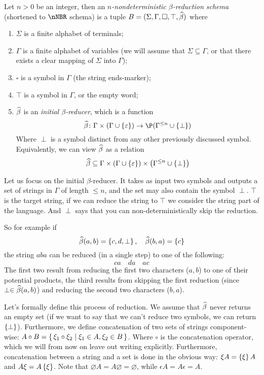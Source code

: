 \documentclass{llncs}
\begin{document}
\begin{definition}

    Let $n>0$ be an integer, then an \emph{$n$-nondeterministic $\beta$-reduction schema} (shortened to $\nNBR$ schema) is
    a tuple $B=(\Sigma,\Gamma,\square,\top,\widehat\beta)$ where
    \begin{enumerate}
        \item $\Sigma$ is a finite alphabet of terminals;
        \item $\Gamma$ is a finite alphabet of variables (we will assume that $\Sigma\subseteq\Gamma$, or that there exists a
            clear mapping of $\Sigma$ into $\Gamma$);
        \item $\square$ is a symbol in $\Gamma$ (the string ends-marker);
        \item $\top$ is a symbol in $\Gamma$, or the empty word;
        \item $\widehat\beta$ is an \emph{initial $\beta$-reducer}, which is a function
        $$ \hb\colon\Gamma\times(\Gamma\cup\set\epsilon)\to\P(\Gamma^{\leq n}\cup\set\perp) $$
        Where $\perp$ is a symbol distinct from any other previously discussed symbol.
        Equivalently, we can view $\widehat\beta$ as a relation
        $$ \hb \subseteq \Gamma\times(\Gamma\cup\set\epsilon)\times\bigl(\Gamma^{\leq n}\cup\set\perp\bigr) $$
    \end{enumerate}

\end{definition}

Let us focus on the initial $\beta$-reducer.
It takes as input two symbols and outputs a set of strings in $\Gamma$ of length $\leq n$, and the set may also
contain the symbol $\perp$.
$\top$ is the target string, if we can reduce the string to $\top$ we consider the string part of the language.
And $\perp$ says that you can non-deterministically skip the reduction.

So for example if
$$ \hb(a,b) = \set{c,d,\perp},\quad \hb(b,a) = \set{c} $$
the string $aba$ can be reduced (in a single step) to one of the following:
$$ ca\quad da\quad ac $$
The first two result from reducing the first two characters ($a,b$) to one of their potential products, the third results from
skipping the first reduction (since $\perp\in\widehat\beta(a,b)$) and reducing the second two characters ($b,a$).

Let's formally define this process of reduction.
We assume that $\widehat\beta$ never returns an empty set (if we want to say that we can't reduce two symbols, we can return $\set\perp$).
Furthermore, we define concatenation of two sets of strings component-wise:
$A\circ B=\set{\xi_1\circ\xi_2}[\xi_1\in A,\xi_2\in B]$.
Where $\circ$ is the concatenation operator, which we will from now on leave out writing explicitly.
Furthermore, concatenation between a string and a set is done in the obvious way: $\xi A=\set\xi A$ and $A\xi=A\set\xi$.
Note that $\varnothing A=A\varnothing=\varnothing$, while $\epsilon A=A\epsilon=A$.
\end{document}
